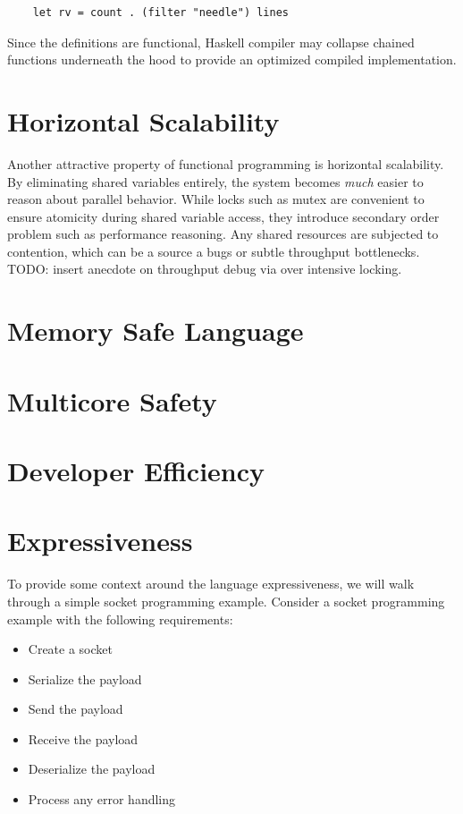 \documentclass{kdp}
\begin{document}
\begin{verbatim}
    let rv = count . (filter "needle") lines 
\end{verbatim}

Since the definitions are functional, Haskell compiler may collapse chained
functions underneath the hood to provide an optimized compiled
implementation.\\

\section{Horizontal Scalability}

Another attractive property of functional programming is horizontal
scalability. By eliminating shared variables entirely, the system becomes
\textit{much} easier to reason about parallel behavior. While locks such as
mutex are convenient to ensure atomicity during shared variable access, they
introduce secondary order problem such as performance reasoning. Any shared
resources are subjected to contention, which can be a source a bugs or subtle
throughput bottlenecks.\\

TODO: insert anecdote on throughput debug via over intensive locking.

\section{Memory Safe Language}

\section{Multicore Safety}

\section{Developer Efficiency}

\section{Expressiveness}

To provide some context around the language expressiveness, we will walk
through a simple socket programming example. Consider a socket programming
example with the following requirements:

\begin{itemize}
    \item Create a socket
    \item Serialize the payload
    \item Send the payload
    \item Receive the payload
    \item Deserialize the payload
    \item Process any error handling
\end{itemize}
\end{document}
